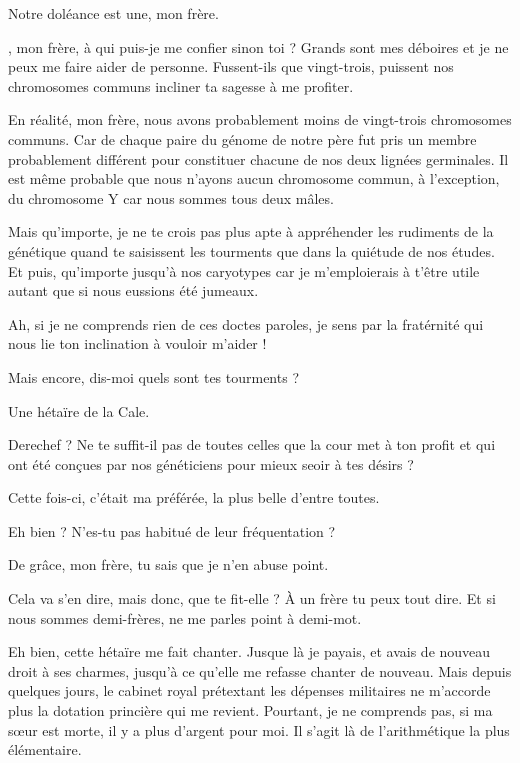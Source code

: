 
\begin{drama}
  \elenaspeaks Notre doléance est une, mon frère.

  \vladimirspeaks \elena, mon frère, à qui puis-je me confier sinon toi ? Grands sont mes déboires et je ne peux me faire aider de personne. Fussent-ils que vingt-trois, puissent nos chromosomes communs incliner ta sagesse à me profiter.

  \elenaspeaks En réalité, mon frère, nous avons probablement moins de vingt-trois chromosomes communs. Car de chaque paire du génome de notre père fut pris un membre probablement différent pour constituer chacune de nos deux lignées germinales. Il est même probable que nous n’ayons aucun chromosome commun, à l’exception, du chromosome Y car nous sommes tous deux mâles.

  Mais qu’importe, je ne te crois pas plus apte à appréhender les rudiments de la génétique quand te saisissent les tourments que dans la quiétude de nos études. Et puis, qu’importe jusqu’à nos caryotypes car je m’emploierais à t’être utile autant que si nous eussions été jumeaux.

  \vladimirspeaks Ah, si je ne comprends rien de ces doctes paroles, je sens par la fratérnité qui nous lie ton inclination à vouloir m’aider !

  \elenaspeaks Mais encore, dis-moi quels sont tes tourments ?

  \vladimirspeaks Une hétaïre de la Cale.

  \elenaspeaks Derechef ? Ne te suffit-il pas de toutes celles que la cour met à ton profit et qui ont été conçues par nos généticiens pour mieux seoir à tes désirs ?

  \vladimirspeaks Cette fois-ci, c’était ma préférée, la plus belle d’entre toutes.

  \elenaspeaks Eh bien ? N’es-tu pas habitué de leur fréquentation ?

  \vladimirspeaks De grâce, mon frère, tu sais que je n’en abuse point.

  \elenaspeaks Cela va s’en dire, mais donc, que te fit-elle ? À un frère tu peux tout dire. Et si nous sommes demi-frères, ne me parles point à demi-mot.

  \vladimirspeaks Eh bien, cette hétaïre me fait chanter. Jusque là je payais, et avais de nouveau droit à ses charmes, jusqu’à ce qu’elle me refasse chanter de nouveau. Mais depuis quelques jours, le cabinet royal prétextant les dépenses militaires ne m’accorde plus la dotation princière qui me revient. Pourtant, je ne comprends pas, si ma sœur est morte, il y a plus d’argent pour moi. Il s’agit là de l’arithmétique la plus élémentaire.


\end{drama}

